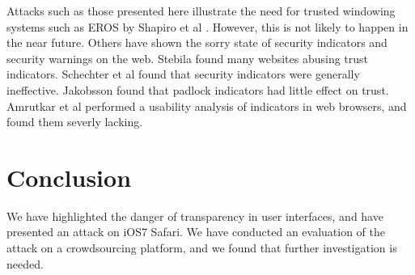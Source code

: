 \documentclass[twoside,letterpaper]{soups}
\begin{document}
Attacks such as those presented here illustrate the need for trusted windowing systems such as EROS by Shapiro et al \cite{shapiro2004design}. However, this is not likely to happen in the near future. Others have shown the sorry state of security indicators and security warnings on the web. Stebila \cite{misuse} found many websites abusing trust indicators. Schechter et al \cite{emperor} found that security indicators were generally ineffective. Jakobsson \cite{indicators} found that padlock indicators had little effect on trust. Amrutkar et al \cite{amrutkar2012measuring} performed a usability analysis of indicators in web browsers, and found them severly lacking. %




\section{Conclusion}\label{chap:conclusion}

We have highlighted the danger of transparency in user interfaces, and have presented an attack on iOS7 Safari. We have conducted an evaluation of the attack on a crowdsourcing platform, and we found that further investigation is needed.
\end{document}
